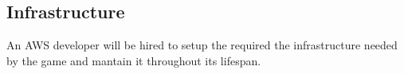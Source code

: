 \subsection{Infrastructure}

An AWS developer will be hired to setup the required the infrastructure needed by the game and mantain it throughout its lifespan.
